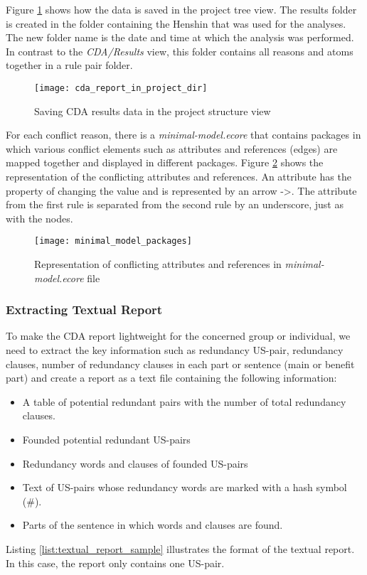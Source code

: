  Figure \ref{fig:cda_report_in_project_dir} shows how the data is saved in the project tree view. The results folder is created in the folder containing the Henshin that was used for the analyses. The new folder name is the date and time at which the analysis was performed. In contrast to the \textit{CDA/Results} view, this folder contains all reasons and atoms together in a rule pair folder.
  \begin{figure}[h]
 	\center
 	\texttt{[image: cda\_report\_in\_project\_dir]}
 	\caption{Saving CDA results data in the project structure view}\label{fig:cda_report_in_project_dir}
 \end{figure}
 
 For each conflict reason, there is a \textit{minimal-model.ecore} that contains packages in which various conflict elements such as attributes and references (edges) are mapped together and displayed in different packages. Figure \ref{fig:minimal_model_packages} shows the representation of the conflicting attributes and references. An attribute has the property of changing the value and is represented by an arrow -\textgreater. The attribute from the first rule is separated from the second rule by an underscore, just as with the nodes.
  \begin{figure}[h]
 	\center
 	\texttt{[image: minimal\_model\_packages]}
 	\caption{Representation of conflicting attributes and references in \textit{minimal-model.ecore} file}\label{fig:minimal_model_packages}
 \end{figure}
\subsubsection*{Extracting Textual Report}
To make the CDA report lightweight for the concerned group or individual, we need to extract the key information such as redundancy US-pair, redundancy clauses, number of redundancy clauses in each part or sentence (main or benefit part) and create a report as a text file containing the following information:
\begin{itemize}
	\item A table of potential redundant pairs with the number of total redundancy clauses.
	\item Founded potential redundant US-pairs
	\item Redundancy words and clauses of founded US-pairs
	\item Text of US-pairs whose redundancy words are marked with a hash symbol (\#).
	\item Parts of the sentence in which words and clauses are found.
\end{itemize}
Listing \ref{list:textual_report_sample} illustrates the format of the textual report. In this case, the report only contains one US-pair.

